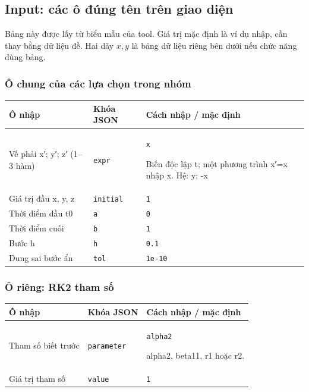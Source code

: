 \subsection*{Input: các ô đúng tên trên giao diện}
Bảng này được lấy từ biểu mẫu của tool. Giá trị mặc định là ví dụ nhập, cần thay bằng dữ liệu đề. Hai dãy $x,y$ là bảng dữ liệu riêng bên dưới nếu chức năng dùng bảng.
\subsubsection*{Ô chung của các lựa chọn trong nhóm}
\begin{center}\small\begin{tabular}{@{}p{.32\linewidth}p{.17\linewidth}p{.43\linewidth}@{}}\toprule
Ô nhập & Khóa JSON & Cách nhập / mặc định\\\midrule
Vế phải x′;\allowbreak{} y′;\allowbreak{} z′ (1–3 hàm) & \texttt{expr} & \texttt{x}
\par Biến độc lập t;\allowbreak{} một phương trình x′=x nhập x. Hệ: y;\allowbreak{} -x\\[3pt]
Giá trị đầu x,\allowbreak{} y,\allowbreak{} z & \texttt{initial} & \texttt{1}\\[3pt]
Thời điểm đầu t0 & \texttt{a} & \texttt{0}\\[3pt]
Thời điểm cuối & \texttt{b} & \texttt{1}\\[3pt]
Bước h & \texttt{h} & \texttt{0.1}\\[3pt]
Dung sai bước ẩn & \texttt{tol} & \texttt{1e-10}\\[3pt]
\bottomrule\end{tabular}\end{center}
\subsubsection*{Ô riêng: RK2 tham số}
\begin{center}\small\begin{tabular}{@{}p{.32\linewidth}p{.17\linewidth}p{.43\linewidth}@{}}\toprule
Ô nhập & Khóa JSON & Cách nhập / mặc định\\\midrule
Tham số biết trước & \texttt{parameter} & \texttt{alpha2}
\par alpha2,\allowbreak{} beta11,\allowbreak{} r1 hoặc r2.\\[3pt]
Giá trị tham số & \texttt{value} & \texttt{1}\\[3pt]
\bottomrule\end{tabular}\end{center}
